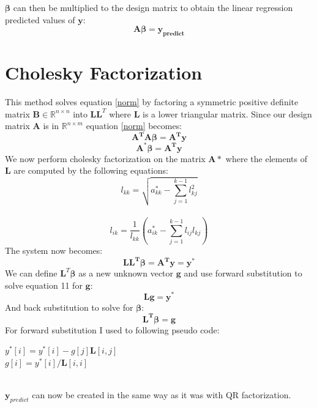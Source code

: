 \documentclass[11pt]{article}
\begin{document}
\begin{enumerate}
$\bm \beta$ can then be multiplied to the design matrix to obtain the linear regression predicted values of $\bm y$:
\begin{equation}
    \bm{ A \beta  = y_{predict}}
\end{equation}

\section{Cholesky Factorization}
This method solves equation \ref{norm} by factoring a symmetric positive definite matrix $\bm B \in \mathbb{R}^{n\times n}$  into $\bm L \bm L^T$ where $\bm L $ is a lower triangular matrix. Since our design matrix $\bm A$ is in $\mathbb{R}^{n\times m}$ equation \ref{norm} becomes:
\begin{equation}
    \bm{A^T A \beta = A^T y}
\end{equation}
\begin{equation}
    \bm {A^{*} \beta = A^T y}
\end{equation}
We now perform cholesky factorization on the matrix $\bm A{*}$ where the elements of $\bm L$ are computed by the following equations:
\begin{equation}
    l_{kk} = \sqrt{a^{*}_{kk} - \sum_{j=1}^{k-1} l_{kj}^2}
\end{equation}\\
\begin{equation}
    l_{ik} = \frac{1}{l_{kk}}(a^{*}_{ik} - \sum_{j=1}^{k-1} l_{ij}l_{kj})
\end{equation}
The system now becomes:
\begin{equation}
    \bm{L L^T \beta = A^T y = y^{*}}
\end{equation}
We can define $\bm L^T \bm \beta$ as a new unknown vector $\bm g$ and use forward substitution to solve equation 11 for $\bm g$:
\begin{equation}
    \bm{L g = y^{*}}
\end{equation}
And back substitution to solve for $\bm \beta$:
\begin{equation}
    \bm{L^T \beta = g}
\end{equation}
For forward substitution I used to following pseudo code:
\begin{algorithm}
  \begin{algorithmic}[]
        \STATE $y^{*}[i]= y^{*}[i] - g[j]\bm L[i,j]$
      \ENDFOR\\
      $g[i] = y^{*}[i]/\bm L[i,i]$
    \ENDFOR
  \end{algorithmic}
\end{algorithm}\\
$\bm y_{predict}$ can now be created in the same way as it was with QR factorization.

\end{enumerate}
\end{document}
